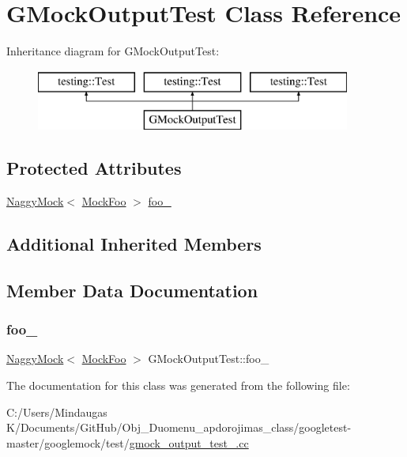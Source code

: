 \hypertarget{class_g_mock_output_test}{}\section{G\+Mock\+Output\+Test Class Reference}
\label{class_g_mock_output_test}
Inheritance diagram for G\+Mock\+Output\+Test\+:\begin{figure}[H]
\begin{center}
\leavevmode
\includegraphics[height=2.000000cm]{d9/d3d/class_g_mock_output_test}
\end{center}
\end{figure}
\subsection*{Protected Attributes}
\begin{DoxyCompactItemize}
\item 
\mbox{\hyperlink{classtesting_1_1_naggy_mock}{Naggy\+Mock}}$<$ \mbox{\hyperlink{class_mock_foo}{Mock\+Foo}} $>$ \mbox{\hyperlink{class_g_mock_output_test_a17e42c7b9307755539ae98736f8a4de1}{foo\+\_\+}}
\end{DoxyCompactItemize}
\subsection*{Additional Inherited Members}


\subsection{Member Data Documentation}
\mbox{\label{class_g_mock_output_test_a17e42c7b9307755539ae98736f8a4de1}} 
\subsubsection{\texorpdfstring{foo\_}{foo\_}}
{\footnotesize\ttfamily \mbox{\hyperlink{classtesting_1_1_naggy_mock}{Naggy\+Mock}}$<$ \mbox{\hyperlink{class_mock_foo}{Mock\+Foo}} $>$ G\+Mock\+Output\+Test\+::foo\+\_\+\hspace{0.3cm}{\ttfamily [protected]}}



The documentation for this class was generated from the following file\+:\begin{DoxyCompactItemize}
\item 
C\+:/\+Users/\+Mindaugas K/\+Documents/\+Git\+Hub/\+Obj\+\_\+\+Duomenu\+\_\+apdorojimas\+\_\+class/googletest-\/master/googlemock/test/\mbox{\hyperlink{googletest-master_2googlemock_2test_2gmock__output__test___8cc}{gmock\+\_\+output\+\_\+test\+\_\+.\+cc}}\end{DoxyCompactItemize}
